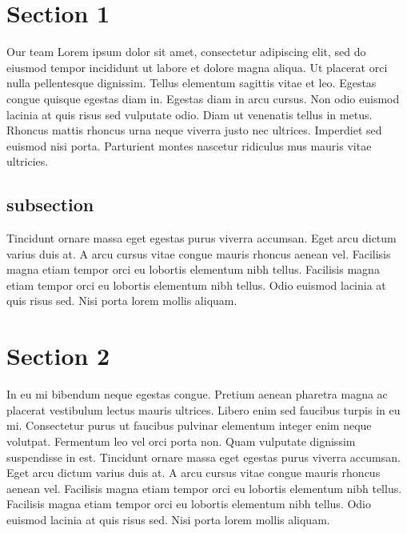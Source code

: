 
\headerandfooter



\doctitlepage
\tableofcontents

\pagebreak
\section{Section 1}

Our team Lorem ipsum dolor sit amet, consectetur adipiscing elit, sed do eiusmod tempor incididunt ut labore et dolore magna aliqua. Ut placerat orci nulla pellentesque dignissim. Tellus elementum sagittis vitae et leo. Egestas congue quisque egestas diam in. Egestas diam in arcu cursus. Non odio euismod lacinia at quis risus sed vulputate odio. Diam ut venenatis tellus in metus. Rhoncus mattis rhoncus urna neque viverra justo nec ultrices. Imperdiet sed euismod nisi porta. Parturient montes nascetur ridiculus mus mauris vitae ultricies.

\subsection{subsection}

Tincidunt ornare massa eget egestas purus viverra accumsan. Eget arcu dictum varius duis at. A arcu cursus vitae congue mauris rhoncus aenean vel. Facilisis magna etiam tempor orci eu lobortis elementum nibh tellus. Facilisis magna etiam tempor orci eu lobortis elementum nibh tellus. Odio euismod lacinia at quis risus sed. Nisi porta lorem mollis aliquam.

\section{Section 2}

In eu mi bibendum neque egestas congue. Pretium aenean pharetra magna ac placerat vestibulum lectus mauris ultrices. Libero enim sed faucibus turpis in eu mi. Consectetur purus ut faucibus pulvinar elementum integer enim neque volutpat. Fermentum leo vel orci porta non. Quam vulputate dignissim suspendisse in est. Tincidunt ornare massa eget egestas purus viverra accumsan. Eget arcu dictum varius duis at. A arcu cursus vitae congue mauris rhoncus aenean vel. Facilisis magna etiam tempor orci eu lobortis elementum nibh tellus. Facilisis magna etiam tempor orci eu lobortis elementum nibh tellus. Odio euismod lacinia at quis risus sed. Nisi porta lorem mollis aliquam.



